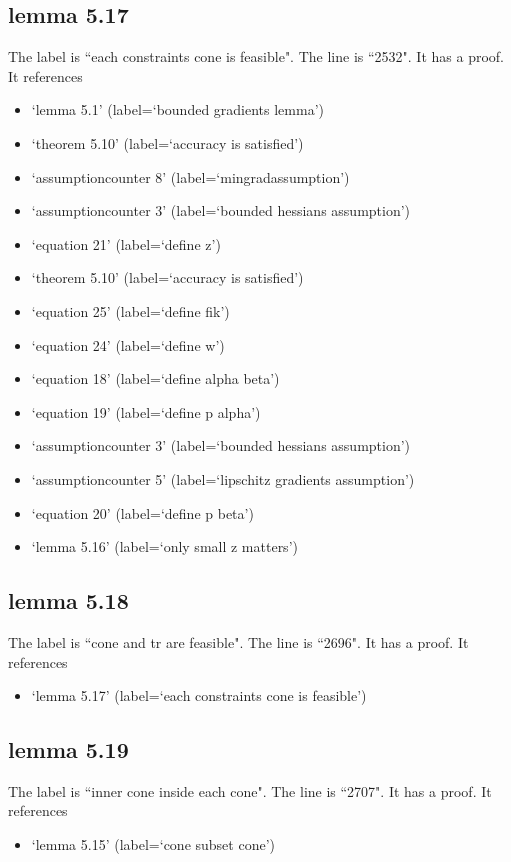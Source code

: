 \documentclass{article}
\begin{document}
\subsection{lemma 5.17}
The label is ``each constraints cone is feasible".
The line is ``2532".
It has a proof.
It references \begin{itemize}
\item `lemma 5.1' (label=`bounded gradients lemma')
\item `theorem 5.10' (label=`accuracy is satisfied')
\item `assumptioncounter 8' (label=`mingradassumption')
\item `assumptioncounter 3' (label=`bounded hessians assumption')
\item `equation 21' (label=`define z')
\item `theorem 5.10' (label=`accuracy is satisfied')
\item `equation 25' (label=`define fik')
\item `equation 24' (label=`define w')
\item `equation 18' (label=`define alpha beta')
\item `equation 19' (label=`define p alpha')
\item `assumptioncounter 3' (label=`bounded hessians assumption')
\item `assumptioncounter 5' (label=`lipschitz gradients assumption')
\item `equation 20' (label=`define p beta')
\item `lemma 5.16' (label=`only small z matters')
\end{itemize}
\subsection{lemma 5.18}
The label is ``cone and tr are feasible".
The line is ``2696".
It has a proof.
It references \begin{itemize}
\item `lemma 5.17' (label=`each constraints cone is feasible')
\end{itemize}
\subsection{lemma 5.19}
The label is ``inner cone inside each cone".
The line is ``2707".
It has a proof.
It references \begin{itemize}
\item `lemma 5.15' (label=`cone subset cone')
\end{itemize}
\end{document}
